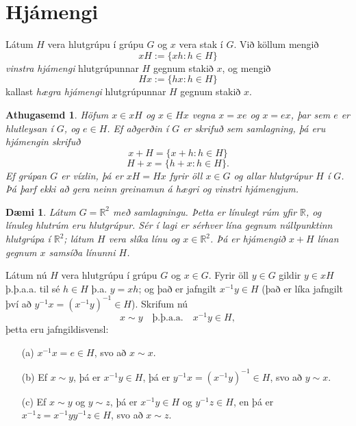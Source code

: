 \documentclass[a4paper,icelandic,11pt]{book}
\theoremstyle{plain}
\newtheorem{daemi}{Dæmi}[chapter]
\newtheorem*{ath}{Athugasemd}
\newcommand{\R}{\mathbb{R}}
\begin{document}
\section{Hjámengi}
\begin{skilgr}
  Látum $H$ vera hlutgrúpu í grúpu $G$ og $x$ vera stak í $G$. Við köllum mengið
  \begin{equation*}
    xH := \{ xh : h\in H \}
  \end{equation*}
  \emph{vinstra hjámengi} hlutgrúpunnar $H$ gegnum stakið $x$, og mengið
  \begin{equation*}
    Hx := \{ hx : h\in H \}
  \end{equation*}
  kallast \emph{hægra hjámengi} hlutgrúpunnar $H$ gegnum stakið $x$. 
\end{skilgr}
\begin{ath}
  Höfum $x\in xH$ og $x\in Hx$ vegna $x = xe$ og $x=ex$, þar sem $e$ er
  hlutleysan í $G$, og $e\in H$. Ef aðgerðin í $G$ er skrifuð sem samlagning, þá
  eru hjámengin skrifuð
  \[
    x+H = \{ x+h: h\in H\}
  \]
  \[
    H + x = \{ h + x: h\in H\}.
  \]
  Ef grúpan $G$ er víxlin, þá er $xH = Hx$ fyrir öll $x\in G$ og allar
  hlutgrúpur $H$ í $G$. Þá þarf ekki að gera neinn greinamun á hægri og vinstri
  hjámengjum.
\end{ath}
\begin{daemi}
  Látum $G= \R^2$ með samlagningu. Þetta er línulegt rúm yfir $\R$, og línuleg
  hlutrúm eru hlutgrúpur. Sér í lagi er sérhver lína gegnum núllpunktinn
  hlutgrúpa í $\R^2$; látum $H$ vera slíka línu og $x\in\R^2$. Þá er hjámengið
  $x+H$ línan gegnum $x$ samsíða línunni $H$.
\end{daemi}
Látum nú $H$ vera hlutgrúpu í grúpu $G$ og $x\in G$. Fyrir öll $y\in G$ gildir
$y\in xH$ þ.þ.a.a. til sé $h\in H$ þ.a. $y = xh$; og það er jafngilt $x^{-1} y
\in H$ (það er líka jafngilt því að $y^{-1} x = (x^{-1}y)^{-1} \in H$). Skrifum
nú
\begin{equation*}
  x\sim y \quad\text{þ.þ.a.a.}\quad x^{-1} y \in H,
\end{equation*}
þetta eru jafngildisvensl:
\begin{itemize}
  \item [(a)] $x^{-1} x = e\in H$, svo að $x\sim x$.
  \item [(b)] Ef $x\sim y$, þá er $x^{-1}y \in H$, þá er $y^{-1}x =
    (x^{-1}y)^{-1}\in H$, svo að $y\sim x$.
  \item [(c)] Ef $x\sim y$ og $y\sim z$, þá er $x^{-1}y\in H$ og $y^{-1} z\in
    H$, en þá er $x^{-1}z = x^{-1}yy^{-1}z \in H$, svo að $x\sim z$.
\end{itemize}
\end{document}
